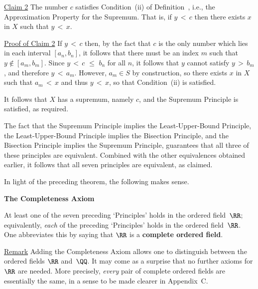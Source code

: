         \underline{Claim 2} The number $c$ satisfies Condition~(ii) of Definition~, i.e., the Approximation Property for the Supremum.
    That is, if $y\,<\,c$ then there exists $x$ in $X$ such that $y\,<\,x$.

        \underline{Proof of Claim 2} If $y\,<\,c$ then, by the fact that $c$ is the only number which lies in each interval $[a_{n}, b_{n}]$,
    it follows that there must be an index $m$ such that $y\not \in [a_{m},b_{m}]$.
    Since $y\,<\,c\,\,{\leq}\,\,b_{n}$ for all $n$, it follows that $y$ cannot satisfy $y\,>\,b_{m}$,
    and therefore $y\,<\,a_{m}$. However, $a_{m}{\in}S$ by construction, so there exists $x$ in $X$ such that $a_{m}\,<\,x$ and thus $y\,<\,x$, so that Condition~(ii) is satisfied.

        It follows that $X$ has a supremum, namely $c$, and the Supremum Principle is satisfied, as required.

\VV

        The fact that the Supremum Principle implies the Least-Upper-Bound Principle, the Least-Upper-Bound Principle implies the Bisection Principle,
    and the Bisection Principle implies the Supremum Principle, guarantees that all three of these principles are equivalent.
    Combined with the other equivalences obtained earlier, it follows that all seven principles are equivalent, as claimed.


\VV

        In light of the preceding theorem, the following makes sense.

\V

            {\bf The Completeness Axiom}

\V

        At least one of the seven preceding `Principles' holds in the ordered field~${\RR}$;
    equivalently, {\em each} of the preceding `Principles' holds in the ordered field~${\RR}$.
    One abbreviates this by saying that ${\RR}$ is a {\bf complete ordered field}.

\VV

        \underline{Remark} Adding the Completeness Axiom allows one to distinguish between the ordered fields ${\RR}$ and~${\QQ}$.
    It may come as a surprise that no further axioms for ${\RR}$ are needed.
    More precisely, {\em every} pair of complete ordered fields are essentially the same, in a sense to be made clearer in Appendix~C.


